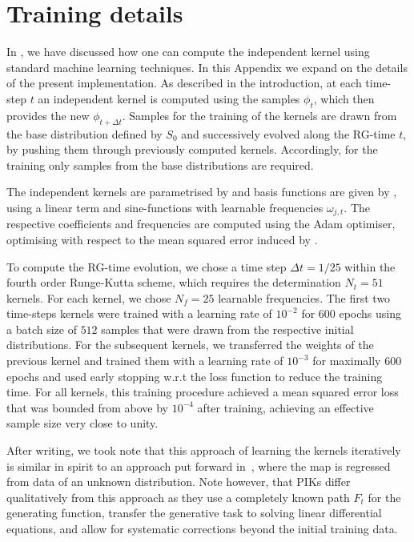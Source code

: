 \documentclass[reprint,amsmath,amssymb,aps,pra,superscriptaddress,nofootinbib,twocolumn,floatfix,nolongbibliography]{revtex4-2}
\begin{document}
\appendix


\section{Training details}
\label{sec:TrainingDetails}

In , we have discussed how one can compute the independent kernel using standard machine learning techniques. In this Appendix we expand on the details of the present implementation.
As described in the introduction, at each time-step $t$ an independent kernel is computed using the samples $\phi_t$, which then provides the new $\phi_{t+\Delta t}$.
Samples for the training of the kernels are drawn from the base distribution defined by $S_0$ and successively evolved along the RG-time $t$, by pushing them through previously computed kernels. Accordingly, for the training only samples from the base distributions are required.

The independent kernels are parametrised by  and basis functions are given by , using a linear term and sine-functions with learnable frequencies $\omega_{j,t}$. The respective coefficients and frequencies are computed using the Adam optimiser, optimising with respect to the mean squared error induced by . 

To compute the RG-time evolution, we chose a time step $\Delta t = 1 /25$ within the fourth order Runge-Kutta scheme, which requires the determination $N_t = 51$ kernels. For each kernel, we chose $N_f=25$ learnable frequencies. The first two time-steps kernels were trained with a learning rate of $10^{-2}$ for 600 epochs using a batch size of $512$ samples that were drawn from the respective initial distributions. For the subsequent kernels, we transferred the weights of the previous kernel and trained them with a learning rate of $10^{-3}$ for maximally 600 epochs and used early stopping w.r.t the loss function to reduce the training time. For all kernels, this training procedure achieved a mean squared error loss that was bounded from above by $10^{-4}$ after training, achieving an effective sample size very close to unity.

After writing, we took note that this approach of learning the kernels iteratively is similar in spirit to an approach put forward in~\cite{Xu:2024jko}, where the map is regressed from data of an unknown distribution. Note however, that PIKs differ qualitatively from this approach as they use a completely known path $F_t$ for the generating function, transfer the generative task to solving linear differential equations, and allow for systematic corrections beyond the initial training data.
\end{document}
